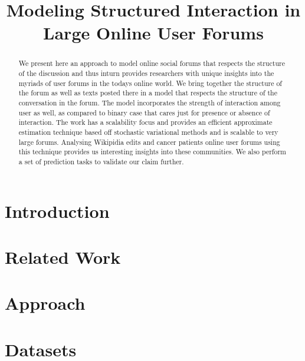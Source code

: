 \documentclass{article}
\title{Modeling Structured Interaction in \\ Large Online User Forums }
\newcommand{\comment}[1]{{\color{red}{#1}}}
\begin{document}
\maketitle
\begin{abstract}
We present here an approach to model online social forums that respects the
structure of the discussion and thus inturn provides researchers with unique
insights into the myriads of user forums in the todays online world. We
bring together the structure of the forum as well as texts posted there
in a model that respects the structure of the conversation in the forum. The
model incorporates the strength of interaction among user as well, as compared
to binary case that cares just for presence or absence of interaction. The
work has a scalability focus and provides an efficient approximate estimation 
technique based off stochastic variational methods and is scalable to very
large forums.
Analysing Wikipidia edits and cancer patients online user forums using this 
technique provides us interesting insights into these communities.
We also perform a set of prediction tasks to validate our claim
further.
\end{abstract}

\section{Introduction}


\section{Related Work}


\section{Approach}


\section{Datasets}

% 
% 
% 
\end{document}
